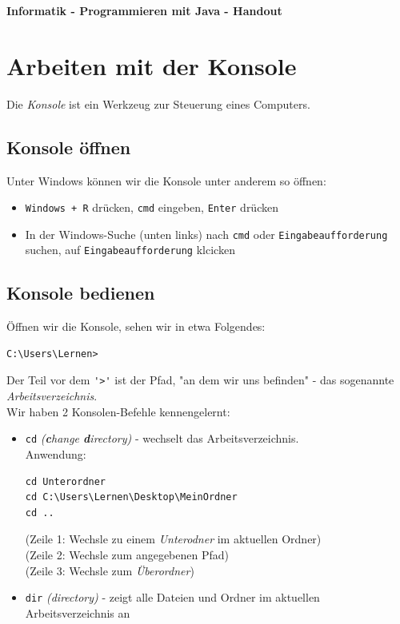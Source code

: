 \documentclass[ngerman,11pt]{article}
\begin{document}
    \setlength{\parindent}{0}

    {\huge \textbf{Informatik - Programmieren mit Java - Handout}}

    \vspace{1cm}


    \section{Arbeiten mit der Konsole}
    Die \textit{Konsole} ist ein Werkzeug zur Steuerung eines Computers.

    \vspace{0.5cm}

    \subsection{Konsole öffnen}
    Unter Windows können wir die Konsole unter anderem so öffnen:
    \begin{itemize}
        \item \lstinline{Windows + R} drücken, \lstinline{cmd} eingeben, \lstinline{Enter} drücken
        \item In der Windows-Suche (unten links) nach \lstinline{cmd} oder \lstinline{Eingabeaufforderung} suchen, auf \lstinline{Eingabeaufforderung} klcicken
    \end{itemize}

    \vspace{0.5cm}

    \subsection{Konsole bedienen}
    Öffnen wir die Konsole, sehen wir in etwa Folgendes:

    \begin{lstlisting}
C:\Users\Lernen>
    \end{lstlisting}

    Der Teil vor dem \lstinline{'>'} ist der Pfad, "an dem wir uns befinden" - das sogenannte \textit{Arbeitsverzeichnis}. \\

    Wir haben 2 Konsolen-Befehle kennengelernt:
    \begin{itemize}
        \item \lstinline{cd} \textit{(\textbf{c}hange \textbf{d}irectory)} - wechselt das Arbeitsverzeichnis. \\
        Anwendung:
        \begin{lstlisting}
cd Unterordner
cd C:\Users\Lernen\Desktop\MeinOrdner
cd ..
        \end{lstlisting}
        (Zeile 1: Wechsle zu einem \textit{Unterodner} im aktuellen Ordner) \\
        (Zeile 2: Wechsle zum angegebenen Pfad) \\
        (Zeile 3: Wechsle zum \textit{Überordner}) \\

        \item \lstinline{dir} \textit{(directory)} - zeigt alle Dateien und Ordner im aktuellen Arbeitsverzeichnis an
    \end{itemize}
\end{document}
